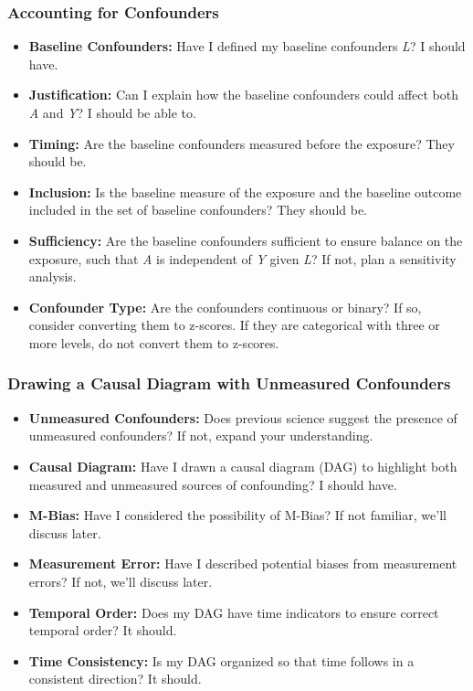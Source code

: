 \documentclass[
  singlecolumn]{article}
\providecommand{\tightlist}{%
  \setlength{\itemsep}{0pt}\setlength{\parskip}{0pt}}\usepackage{longtable,booktabs,array}
\begin{document}
\hypertarget{accounting-for-confounders}{%
\subsubsection{Accounting for
Confounders}\label{accounting-for-confounders}}

\begin{itemize}
\tightlist
\item
  \textbf{Baseline Confounders:} Have I defined my baseline confounders
  \emph{L}? I should have.
\item
  \textbf{Justification:} Can I explain how the baseline confounders
  could affect both \emph{A} and \emph{Y}? I should be able to.
\item
  \textbf{Timing:} Are the baseline confounders measured before the
  exposure? They should be.
\item
  \textbf{Inclusion:} Is the baseline measure of the exposure and the
  baseline outcome included in the set of baseline confounders? They
  should be.
\item
  \textbf{Sufficiency:} Are the baseline confounders sufficient to
  ensure balance on the exposure, such that \emph{A} is independent of
  \emph{Y} given \emph{L}? If not, plan a sensitivity analysis.
\item
  \textbf{Confounder Type:} Are the confounders continuous or binary? If
  so, consider converting them to z-scores. If they are categorical with
  three or more levels, do not convert them to z-scores.
\end{itemize}

\hypertarget{drawing-a-causal-diagram-with-unmeasured-confounders}{%
\subsubsection{Drawing a Causal Diagram with Unmeasured
Confounders}\label{drawing-a-causal-diagram-with-unmeasured-confounders}}

\begin{itemize}
\tightlist
\item
  \textbf{Unmeasured Confounders:} Does previous science suggest the
  presence of unmeasured confounders? If not, expand your understanding.
\item
  \textbf{Causal Diagram:} Have I drawn a causal diagram (DAG) to
  highlight both measured and unmeasured sources of confounding? I
  should have.
\item
  \textbf{M-Bias:} Have I considered the possibility of M-Bias? If not
  familiar, we'll discuss later.
\item
  \textbf{Measurement Error:} Have I described potential biases from
  measurement errors? If not, we'll discuss later.
\item
  \textbf{Temporal Order:} Does my DAG have time indicators to ensure
  correct temporal order? It should.
\item
  \textbf{Time Consistency:} Is my DAG organized so that time follows in
  a consistent direction? It should.
\end{itemize}
\end{document}
